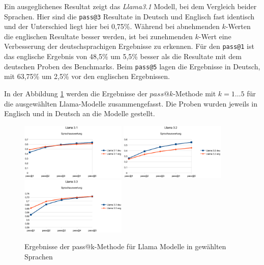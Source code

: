 Ein ausgeglichenes Resultat zeigt das \textit{Llama3.1} Modell, bei dem Vergleich beider Sprachen. Hier sind die \texttt{pass@3} Resultate in Deutsch und Englisch fast identisch und der Unterschied liegt hier bei 0,75\%. Während bei abnehmenden $k$-Werten die englischen Resultate besser werden, ist bei zunehmenden $k$-Wert eine Verbesserung der deutschsprachigen Ergebnisse zu erkennen. Für den \texttt{pass@1} ist das englische Ergebnis von 48,5\% um 5,5\% besser als die Resultate mit dem deutschen Proben des Benchmarks. Beim \texttt{pass@5} lagen die Ergebnisse in Deutsch, mit 63,75\% um 2,5\% vor den englischen Ergebnissen.\vspace{0.2cm}

In der Abbildung \ref{img:pass_at_k_results_by_llama_lang} werden die Ergebnisse der $pass@k$-Methode mit $k=1 … 5$ für die ausgewählten Llama-Modelle zusammengefasst. Die Proben wurden jeweils in Englisch und in Deutsch an die Modelle gestellt.\vspace{0.2cm}

\begin{figure}[!ht]
	\includegraphics[width=0.45\textwidth]{content/chapter_evaluation/images/llama31_evaluation_lang.eps}
	\includegraphics[width=0.45\textwidth]{content/chapter_evaluation/images/llama32_evaluation_lang.eps}
	\includegraphics[width=0.45\textwidth]{content/chapter_evaluation/images/llama33_evaluation_lang.eps}
	\caption{Ergebnisse der pass@k-Methode für Llama Modelle in gewählten Sprachen}
	\label{img:pass_at_k_results_by_llama_lang}
\end{figure}

